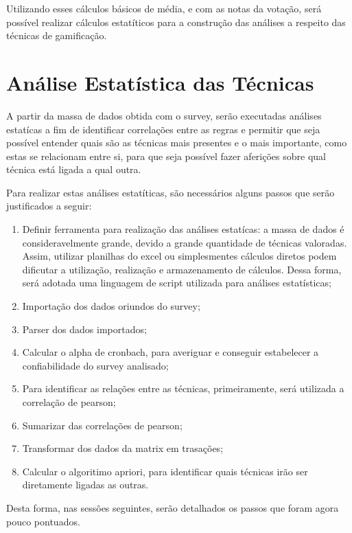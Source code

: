 Utilizando esses cálculos básicos de média, e com as notas da votação, será possível realizar cálculos estatíticos para a construção
das análises a respeito das técnicas de gamificação.



\section{Análise Estatística das Técnicas}
\label{sub:an_lise_estat_stica_das_t_cnicas}
A partir da massa de dados obtida com o survey, serão executadas análises estatícas a fim de identificar correlações
entre as regras e permitir que seja possível entender quais são as técnicas mais presentes e o mais importante, como
estas se relacionam entre si, para que seja possível fazer aferições sobre qual técnica está ligada a qual outra.

Para realizar estas análises estatíticas, são necessários alguns passos que serão justificados a seguir:

\begin{enumerate}
    \item Definir ferramenta para realização das análises estatícas: a massa de dados é consideravelmente grande, devido 
        a grande quantidade de técnicas valoradas. Assim, utilizar planilhas do excel ou simplesmentes cálculos diretos
        podem dificutar a utilização, realização e armazenamento de cálculos. Dessa forma, será adotada uma linguagem
        de script utilizada para análises estatísticas;
    \item Importação dos dados oriundos do survey;
    \item Parser dos dados importados;
    \item Calcular o alpha de cronbach, para averiguar e conseguir estabelecer a confiabilidade do survey analisado;
    \item Para identificar as relações entre as técnicas, primeiramente, será utilizada a correlação de pearson;
    \item Sumarizar das correlações de pearson;
    \item Transformar dos dados da matrix em trasações;
    \item Calcular o algoritimo apriori, para identificar quais técnicas irão ser diretamente ligadas as outras.
\end{enumerate}

Desta forma, nas sessões seguintes, serão detalhados os passos que foram agora pouco pontuados.


